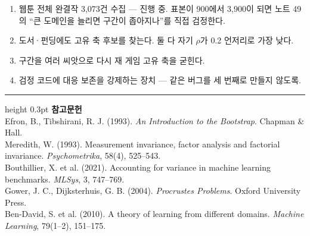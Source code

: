\documentclass[10pt]{article}
\begin{document}
\begin{enumerate}[leftmargin=1.3em,itemsep=0.15em]
\item 웹툰 전체 완결작 3,073건 수집 --- 진행 중. 표본이 900에서 3,900이 되면
      노트 49의 ``큰 도메인을 늘리면 구간이 좁아지나''를 직접 검정한다.
\item 도서·펀딩에도 고유 축 후보를 찾는다. 둘 다 자기 $\rho$가 0.2 언저리로
      가장 낮다.
\item 구간을 여러 씨앗으로 다시 재 게임 고유 축을 굳힌다.
\item 검정 코드에 대응 보존을 강제하는 장치 --- 같은 버그를 세 번째로 만들지
      않도록.
\end{enumerate}

\vspace{0.6em}
\hrule height 0.3pt
\vspace{0.5em}
{\footnotesize
\textbf{참고문헌}\\[0.3em]
Efron, B., Tibshirani, R. J. (1993). \emph{An Introduction to the Bootstrap}.
Chapman \& Hall.\\[0.15em]
Meredith, W. (1993). Measurement invariance, factor analysis and factorial
invariance. \emph{Psychometrika}, 58(4), 525--543.\\[0.15em]
Bouthillier, X. et al. (2021). Accounting for variance in machine learning
benchmarks. \emph{MLSys}, 3, 747--769.\\[0.15em]
Gower, J. C., Dijksterhuis, G. B. (2004). \emph{Procrustes Problems}.
Oxford University Press.\\[0.15em]
Ben-David, S. et al. (2010). A theory of learning from different domains.
\emph{Machine Learning}, 79(1--2), 151--175.
}
\end{document}
